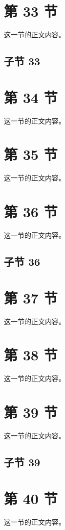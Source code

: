 \documentclass{article}
\begin{document}
\section{第 33 节}
这一节的正文内容。
\subsection{子节 33}
\section{第 34 节}
这一节的正文内容。
\section{第 35 节}
这一节的正文内容。
\section{第 36 节}
这一节的正文内容。
\subsection{子节 36}
\section{第 37 节}
这一节的正文内容。
\section{第 38 节}
这一节的正文内容。
\section{第 39 节}
这一节的正文内容。
\subsection{子节 39}
\section{第 40 节}
这一节的正文内容。
\end{document}
